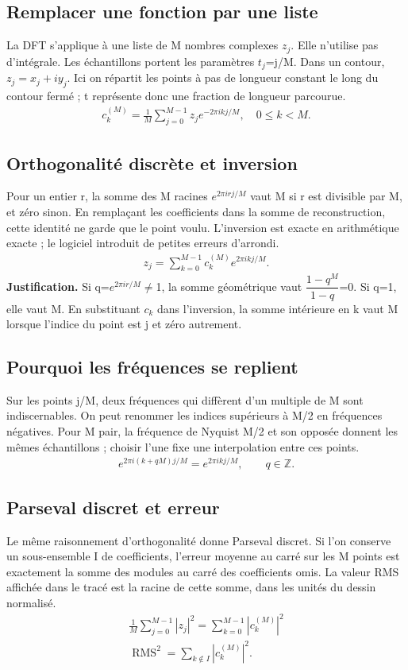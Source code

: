 \documentclass[11pt,a4paper]{article}
\begin{document}
\subsection{Remplacer une fonction par une liste}
La DFT s’applique à une liste de M nombres complexes $z_j$. Elle n’utilise pas d’intégrale. Les échantillons portent les paramètres $t_j$=j/M. Dans un contour, $z_j=x_j+iy_j$. Ici on répartit les points à pas de longueur constant le long du contour fermé ; t représente donc une fraction de longueur parcourue.
\[\begin{gathered}c_k^{(M)}=\frac1M\sum_{j=0}^{M-1}z_j e^{-2\pi ikj/M},\quad 0\le k<M.\end{gathered}\]
\subsection{Orthogonalité discrète et inversion}
Pour un entier r, la somme des M racines $e^{2\pi irj/M}$ vaut M si r est divisible par M, et zéro sinon. En remplaçant les coefficients dans la somme de reconstruction, cette identité ne garde que le point voulu. L’inversion est exacte en arithmétique exacte ; le logiciel introduit de petites erreurs d’arrondi.
\[\begin{gathered}z_j=\sum_{k=0}^{M-1}c_k^{(M)}e^{2\pi ikj/M}.\end{gathered}\]
\textbf{Justification.} Si q=$e^{2\pi ir/M}$$\ne$1, la somme géométrique vaut $\dfrac{1-q^M}{1-q}$=0. Si q=1, elle vaut M. En substituant $c_k$ dans l’inversion, la somme intérieure en k vaut M lorsque l’indice du point est j et zéro autrement.
\subsection{Pourquoi les fréquences se replient}
Sur les points j/M, deux fréquences qui diffèrent d’un multiple de M sont indiscernables. On peut renommer les indices supérieurs à M/2 en fréquences négatives. Pour M pair, la fréquence de Nyquist M/2 et son opposée donnent les mêmes échantillons ; choisir l’une fixe une interpolation entre ces points.
\[\begin{gathered}e^{2\pi i(k+qM)j/M}=e^{2\pi ikj/M},\qquad q\in\mathbb Z.\end{gathered}\]
\subsection{Parseval discret et erreur}
Le même raisonnement d’orthogonalité donne Parseval discret. Si l’on conserve un sous-ensemble I de coefficients, l’erreur moyenne au carré sur les M points est exactement la somme des modules au carré des coefficients omis. La valeur RMS affichée dans le tracé est la racine de cette somme, dans les unités du dessin normalisé.
\[\begin{gathered}\frac1M\sum_{j=0}^{M-1}|z_j|^2=\sum_{k=0}^{M-1}|c_k^{(M)}|^2\\ \operatorname{RMS}^2=\sum_{k\notin I}|c_k^{(M)}|^2.\end{gathered}\]
\end{document}
